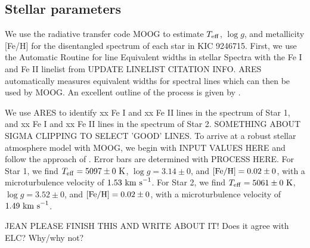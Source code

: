 \subsection{Stellar parameters}\label{parameters}
We use the radiative transfer code MOOG \citep{sne73} to estimate $T_{\rm{eff}}$, $\log g$, and metallicity [Fe/H] for the disentangled spectrum of each star in KIC 9246715. First, we use the Automatic Routine for line Equivalent widths in stellar Spectra \citep[ARES,][]{Sousa_2007} with the Fe I and Fe II linelist from \citet{Yong_2005} UPDATE LINELIST CITATION INFO. ARES automatically measures equivalent widths for spectral lines which can then be used by MOOG. An excellent outline of the process is given by \citet{Sousa_2014}.

We use ARES to identify xx Fe I and xx Fe II lines in the spectrum of Star 1, and xx Fe I and xx Fe II lines in the spectrum of Star 2. SOMETHING ABOUT SIGMA CLIPPING TO SELECT 'GOOD' LINES. To arrive at a robust stellar atmosphere model with MOOG, we begin with INPUT VALUES HERE and follow the approach of \citet{mag13}. Error bars are determined with PROCESS HERE. For Star 1, we find $T_{\rm{eff}} = 5097 \pm 0 \ \rm{K}$, $\log g = 3.14 \pm 0$, and $\rm{[Fe/H]} = 0.02 \pm 0$, with a microturbulence velocity of $1.53 \ \rm{km \ s}^{-1}$. For Star 2, we find $T_{\rm{eff}} = 5061 \pm 0 \ \rm{K}$, $\log g = 3.52 \pm 0$, and $\rm{[Fe/H]} = 0.02 \pm 0$, with a microturbulence velocity of $1.49 \ \rm{km \ s}^{-1}$.

JEAN PLEASE FINISH THIS AND WRITE ABOUT IT! Does it agree with ELC? Why/why not?
    
    
    
    